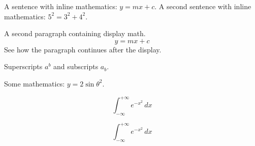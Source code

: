 \documentclass{article}
\begin{document}
	A sentence with inline mathematics: $y = mx + c$.
	A second sentence with inline mathematics: $5^{2}=3^{2}+4^{2}$.
	
	
	A second paragraph containing display math.
	\[
	y = mx + c
	\]
	See how the paragraph continues after the display.
	
	Superscripts $a^{b}$ and subscripts $a_{b}$.
	
	Some mathematics: $y = 2 \sin \theta^{2}$.
	
	\[
	\int_{-\infty}^{+\infty} e^{-x^2} \, dx
	\]
	
	\begin{equation}
		\int_{-\infty}^{+\infty} e^{-x^2} \, dx
	\end{equation}
\end{document}
